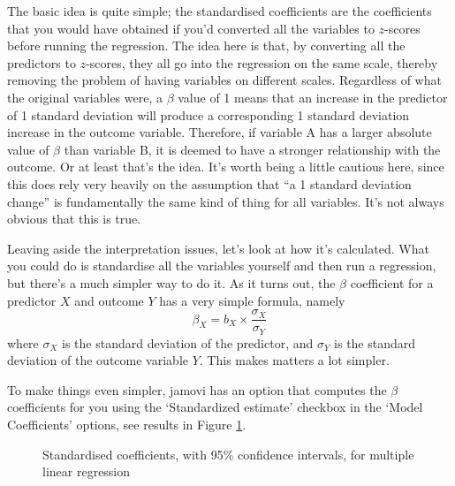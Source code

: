 The basic idea is quite simple; the standardised coefficients are the coefficients that you would have obtained if you'd converted all the variables to $z$-scores before running the regression.  The idea here is that, by converting all the predictors to $z$-scores, they all go into the regression on the same scale, thereby removing the problem of having variables on different scales. Regardless of what the original variables were, a $\beta$ value of 1 means that an increase in the predictor of 1 standard deviation will produce a corresponding 1 standard deviation increase in the outcome variable. Therefore, if variable A has a larger absolute value of $\beta$ than variable B, it is deemed to have a stronger relationship with the outcome. Or at least that's the idea. It's worth being a little cautious here, since this does rely very heavily on the assumption that ``a 1 standard deviation change'' is fundamentally the same kind of thing for all variables. It's not always obvious that this is true.  

\vspace{0.5cm}
\begin{mdframed}[style=MyFrame,nobreak=false]
Leaving aside the interpretation issues, let's look at how it's calculated. What you could do is standardise all the variables yourself and then run a regression, but there's a much simpler way to do it. As it turns out, the $\beta$ coefficient for a predictor $X$ and outcome $Y$ has a very simple formula, namely
$$
\beta_X = b_X \times \frac{\sigma_X}{\sigma_Y} 
$$
where $\sigma_X$ is the standard deviation of the predictor, and $\sigma_Y$ is the standard deviation of the outcome variable $Y$. This makes matters a lot simpler. 
\end{mdframed}

To make things even simpler, jamovi has an option that computes the $\beta$ coefficients for you using the `Standardized estimate' checkbox in the `Model Coefficients' options, see results in Figure \ref{fig:reg3}. 

\begin{figure}[!htb]
\begin{center}
\caption{Standardised coefficients, with 95\% confidence intervals, for multiple linear regression}
\HR
\label{fig:reg3}
\end{center}
\end{figure}

